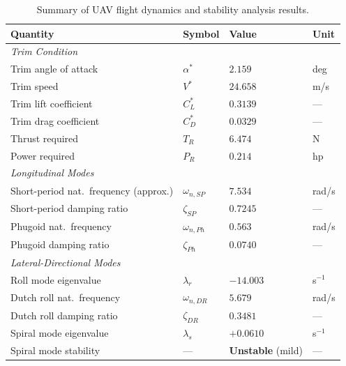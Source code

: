 \begin{table}[H]
  \centering
  \caption{Summary of UAV flight dynamics and stability analysis results.}
  \label{tab:summary}
  \begin{tabular}{llll}
    \toprule
    \textbf{Quantity} & \textbf{Symbol} & \textbf{Value} & \textbf{Unit} \\
    \midrule
    \multicolumn{4}{l}{\textit{Trim Condition}} \\
    Trim angle of attack          & $\alpha^*$           & $2.159$    & deg     \\
    Trim speed                    & $V^*$                & $24.658$   & m/s     \\
    Trim lift coefficient         & $C_L^*$              & $0.3139$   & ---     \\
    Trim drag coefficient         & $C_D^*$              & $0.0329$   & ---     \\
    Thrust required               & $T_R$                & $6.474$    & N       \\
    Power required                & $P_R$                & $0.214$    & hp      \\
    \midrule
    \multicolumn{4}{l}{\textit{Longitudinal Modes}} \\
    Short-period nat.\ frequency (approx.) & $\omega_{n,SP}$ & $7.534$ & rad/s \\
    Short-period damping ratio   & $\zeta_{SP}$         & $0.7245$   & ---     \\
    Phugoid nat.\ frequency      & $\omega_{n,Ph}$      & $0.563$    & rad/s   \\
    Phugoid damping ratio        & $\zeta_{Ph}$         & $0.0740$   & ---     \\
    \midrule
    \multicolumn{4}{l}{\textit{Lateral-Directional Modes}} \\
    Roll mode eigenvalue          & $\lambda_r$          & $-14.003$  & s$^{-1}$\\
    Dutch roll nat.\ frequency   & $\omega_{n,DR}$      & $5.679$    & rad/s   \\
    Dutch roll damping ratio     & $\zeta_{DR}$         & $0.3481$   & ---     \\
    Spiral mode eigenvalue        & $\lambda_s$          & $+0.0610$  & s$^{-1}$\\
    Spiral mode stability         & ---  & \textbf{Unstable} (mild) & ---   \\
    \bottomrule
  \end{tabular}
\end{table}

